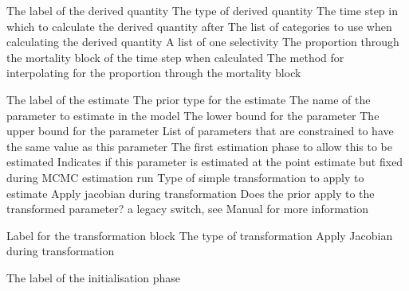 \par\par
{} {The label of the derived quantity}
 {The type of derived quantity}
 {The time step in which to calculate the derived quantity after}
 {The list of categories to use when calculating the derived quantity}
 {A list of one selectivity}
 {The proportion through the mortality block of the time step when calculated}
 {The method for interpolating for the proportion through the mortality block}
 {}
\par\textbf{}\par
\par\textbf{}\par
{}\par\par
{} {The label of the estimate}
 {The prior type for the estimate}
 {The name of the parameter to estimate in the model}
 {The lower bound for the parameter}
 {The upper bound for the parameter}
 {List of parameters that are constrained to have the same value as this parameter}
 {The first estimation phase to allow this to be estimated}
 {Indicates if this parameter is estimated at the point estimate but fixed during MCMC estimation run}
 {Type of simple transformation to apply to estimate}
 {Apply jacobian during transformation}
 {Does the prior apply to the transformed parameter? a legacy switch, see Manual for more information}
\par\par
{} {Label for the transformation block}
 {The type of transformation}
 {Apply Jacobian during transformation}
\par\par
{} {The label of the initialisation phase}
